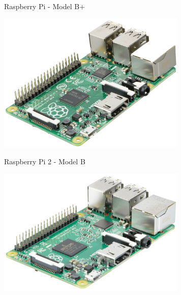 \documentclass[xcolor=svgnames,11pt]{beamer}
\begin{document}
\begin{frame}{Raspberry Pi - Model B+}
\begin{center}
\includegraphics[width=9cm]{raspiB+.png}
\end{center}
\end{frame}

\begin{frame}{Raspberry Pi 2 - Model B}
\begin{center}
\includegraphics[width=9cm]{raspi2.png}
\end{center}
\end{frame}
\end{document}
